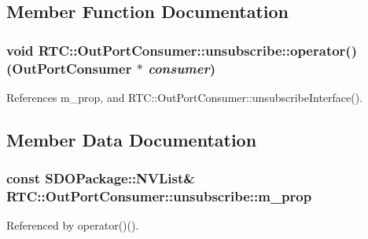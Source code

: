 \subsection{Member Function Documentation}
\subsubsection[{operator()}]{\setlength{\rightskip}{0pt plus 5cm}void RTC::OutPortConsumer::unsubscribe::operator() ({\bf OutPortConsumer} $\ast$ {\em consumer})\hspace{0.3cm}{\ttfamily  [inline]}}\label{structRTC_1_1OutPortConsumer_1_1unsubscribe_aa33d74f73e14a07703c004908460e531}


References m\_\-prop, and RTC::OutPortConsumer::unsubscribeInterface().



\subsection{Member Data Documentation}
\subsubsection[{m\_\-prop}]{\setlength{\rightskip}{0pt plus 5cm}const SDOPackage::NVList\& {\bf RTC::OutPortConsumer::unsubscribe::m\_\-prop}}\label{structRTC_1_1OutPortConsumer_1_1unsubscribe_a70dacb1deb1131431955a193bd8ec07c}


Referenced by operator()().

